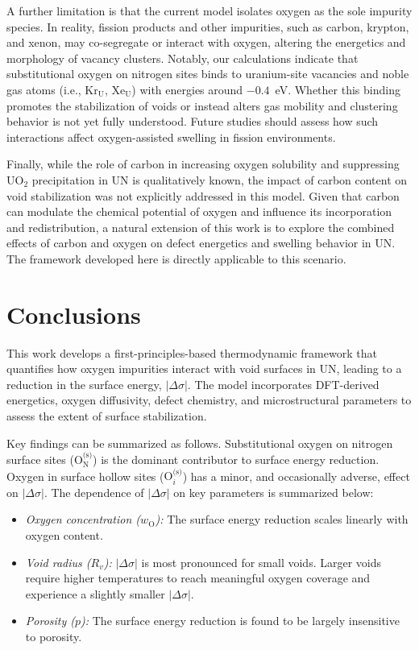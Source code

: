 \documentclass[preprint,12pt,sort&compress]{elsarticle}
\newcommand{\?}{\stackrel{?}{=}}
\providecommand{\DIFaddend}{\protect\color{black}} %
\DeclareRobustCommand{\DIFaddend}{\DIFOaddend \let\includegraphics\DIFOincludegraphics} %
\begin{document}
\DIFaddend A further limitation is that the current model isolates oxygen as the sole impurity species. In reality, fission products and other impurities, such as carbon, krypton, and xenon, may co-segregate or interact with oxygen, altering the energetics and morphology of vacancy clusters. Notably, our calculations indicate that substitutional oxygen on nitrogen sites binds to uranium-site vacancies and noble gas atoms (i.e., Kr$_\text{U}$, Xe$_\text{U}$) with energies around $-0.4$~eV. Whether this binding promotes the stabilization of voids or instead alters gas mobility and clustering behavior is not yet fully understood. Future studies should assess how such interactions affect oxygen-assisted swelling in fission environments.

Finally, while the role of carbon in increasing oxygen solubility and suppressing UO$_2$ precipitation in UN is qualitatively known, the impact of carbon content on void stabilization was not explicitly addressed in this model. Given that carbon can modulate the chemical potential of oxygen and influence its incorporation and redistribution, a natural extension of this work is to explore the combined effects of carbon and oxygen on defect energetics and swelling behavior in UN. The framework developed here is directly applicable to this scenario.

\section{Conclusions}

This work develops a first-principles-based thermodynamic framework that quantifies how oxygen impurities interact with void surfaces in UN, leading to a reduction in the surface energy, $|\Delta \sigma|$. The model incorporates DFT-derived energetics, oxygen diffusivity, defect chemistry, and microstructural parameters to assess the extent of surface stabilization.

Key findings can be summarized as follows. Substitutional oxygen on nitrogen surface sites ($\text{O}_\text{N}^\text{(s)}$) is the dominant contributor to surface energy reduction. Oxygen in surface hollow sites ($\text{O}_i^\text{(s)}$) has a minor, and occasionally adverse, effect on $|\Delta \sigma|$. The dependence of $|\Delta \sigma|$ on key parameters is summarized below:
\begin{itemize}
    \item \textit{Oxygen concentration ($w_\text{O}$):} The surface energy reduction scales linearly with oxygen content.
    \item \textit{Void radius ($R_v$):} $|\Delta \sigma|$ is most pronounced for small voids. Larger voids require higher temperatures to reach meaningful oxygen coverage and experience a slightly smaller $|\Delta \sigma|$.
    \item \textit{Porosity ($p$):} The surface energy reduction is found to be largely insensitive to porosity.
    \end{itemize}
\end{document}
